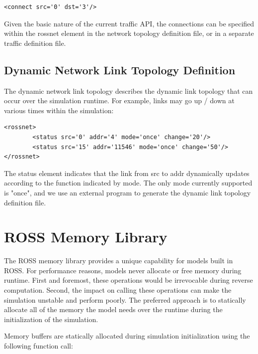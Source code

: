 \documentclass[conference,onecolumn]{IEEEtran}
\begin{document}
\begin{small}\begin{verbatim}
<connect src='0' dst='3'/>
\end{verbatim}\end{small}

Given the basic nature of the current traffic API, the connections can be specified within the rossnet element in the network topology definition file, or in a separate traffic definition file.

\subsection{Dynamic Network Link Topology Definition}

The dynamic network link topology describes the dynamic link topology that can occur over the simulation runtime.  For example, links may go up / down at various times within the simulation:

\begin{small}\begin{verbatim}
<rossnet>
        <status src='0' addr='4' mode='once' change='20'/>
        <status src='15' addr='11546' mode='once' change='50'/>
</rossnet>
\end{verbatim}\end{small}

The status element indicates that the link from src to addr dynamically updates according to the function indicated by mode.  The only mode currently supported is "once", and we use an external program to generate the dynamic link topology definition file.

\section{ROSS Memory Library}
\label{ross-memory}

The ROSS memory library provides a unique capability for models built in ROSS. For performance reasons, models never allocate or free memory during runtime.  First and foremost, these operations would be irrevocable during reverse computation.  Second, the impact on calling these operations can make the simulation unstable and perform poorly.  The preferred approach is to statically allocate all of the memory the model needs over the runtime during the initialization of the simulation.

Memory buffers are statically allocated during simulation initialization using the following function call:
\end{document}
